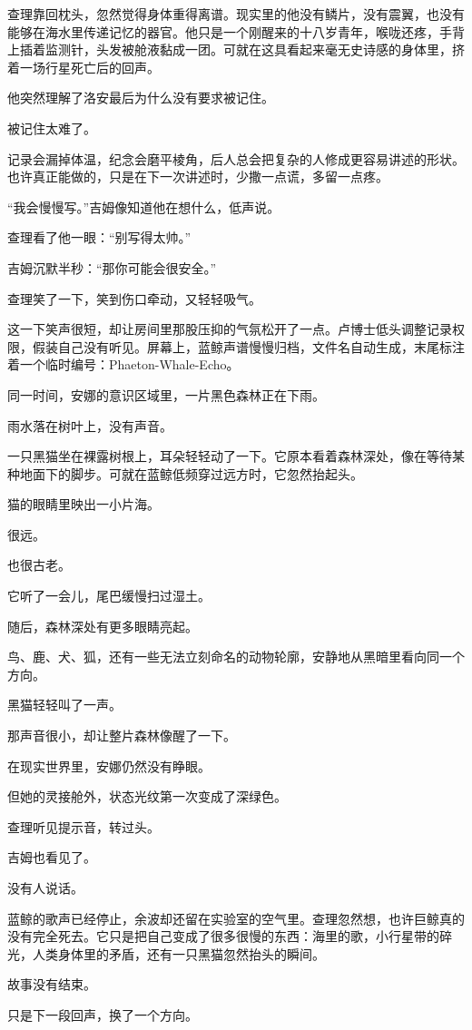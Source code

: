 查理靠回枕头，忽然觉得身体重得离谱。现实里的他没有鳞片，没有震翼，也没有能够在海水里传递记忆的器官。他只是一个刚醒来的十八岁青年，喉咙还疼，手背上插着监测针，头发被舱液黏成一团。可就在这具看起来毫无史诗感的身体里，挤着一场行星死亡后的回声。

他突然理解了洛安最后为什么没有要求被记住。

被记住太难了。

记录会漏掉体温，纪念会磨平棱角，后人总会把复杂的人修成更容易讲述的形状。也许真正能做的，只是在下一次讲述时，少撒一点谎，多留一点疼。

“我会慢慢写。”吉姆像知道他在想什么，低声说。

查理看了他一眼：“别写得太帅。”

吉姆沉默半秒：“那你可能会很安全。”

查理笑了一下，笑到伤口牵动，又轻轻吸气。

这一下笑声很短，却让房间里那股压抑的气氛松开了一点。卢博士低头调整记录权限，假装自己没有听见。屏幕上，蓝鲸声谱慢慢归档，文件名自动生成，末尾标注着一个临时编号：Phaeton-Whale-Echo。

同一时间，安娜的意识区域里，一片黑色森林正在下雨。

雨水落在树叶上，没有声音。

一只黑猫坐在裸露树根上，耳朵轻轻动了一下。它原本看着森林深处，像在等待某种地面下的脚步。可就在蓝鲸低频穿过远方时，它忽然抬起头。

猫的眼睛里映出一小片海。

很远。

也很古老。

它听了一会儿，尾巴缓慢扫过湿土。

随后，森林深处有更多眼睛亮起。

鸟、鹿、犬、狐，还有一些无法立刻命名的动物轮廓，安静地从黑暗里看向同一个方向。

黑猫轻轻叫了一声。

那声音很小，却让整片森林像醒了一下。

在现实世界里，安娜仍然没有睁眼。

但她的灵接舱外，状态光纹第一次变成了深绿色。

查理听见提示音，转过头。

吉姆也看见了。

没有人说话。

蓝鲸的歌声已经停止，余波却还留在实验室的空气里。查理忽然想，也许巨鲸真的没有完全死去。它只是把自己变成了很多很慢的东西：海里的歌，小行星带的碎光，人类身体里的矛盾，还有一只黑猫忽然抬头的瞬间。

故事没有结束。

只是下一段回声，换了一个方向。
